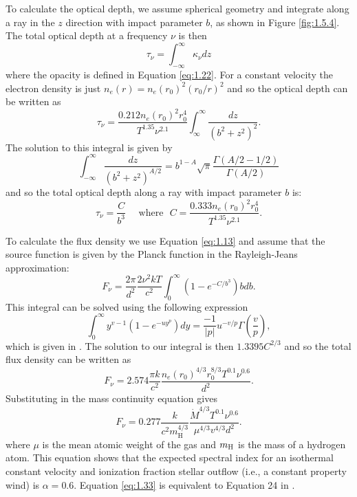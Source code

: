 To calculate the optical depth, we assume spherical geometry and integrate along a ray in the $z$ direction with impact parameter $b$, as shown in Figure \ref{fig:1.5.4}. The total optical depth at a frequency $\nu$ is then
\begin{equation}
\tau _{\nu} = \int ^{\infty} _{-\infty} \kappa _{\nu} dz
\end{equation}
where the opacity is defined in Equation \ref{eq:1.22}. For a constant velocity the electron density is just $n_{e}(r)=n_{e}(r_{0})^2(r_{0}/r)^2$ and so the optical depth can be written as
\begin{equation}
\tau _{\nu} = \frac{0.212n_{e}(r_{0})^2r_{0}^4}{T^{1.35}\nu ^{2.1}}\int ^{\infty} _{\infty}\frac{dz}{(b^2 + z^2)^2}.
\end{equation}
The solution to this integral is given by
\begin{equation}
\int ^{\infty} _{-\infty} \frac{dz}{(b^2 + z^2)^{A/2}}=b^{1-A}\sqrt{\pi}\frac{\Gamma (A/2 -1/2)}{\Gamma (A/2)}
\end{equation}
and so the total optical depth along a ray with impact parameter $b$ is:
\begin{equation}
\tau _{\nu} = \frac{C}{b^3}\ \ \ \ \ \ \mathrm{where}\ \ \ C=\frac{0.333n_{e}(r_{0})^2r_{0}^4}{T^{1.35}\nu ^{2.1}}.
\end{equation}

To calculate the flux density we use Equation \ref{eq:1.13} and assume that the source function is given by the Planck function in the Rayleigh-Jeans approximation:
\begin{equation}
F_{\nu} = \frac{2\pi}{d^2}\frac{2\nu ^2 kT}{c^2} \int ^{\infty} _{0}(1-e^{-C/b^3})bdb.
\end{equation}
This integral can be solved using the following expression
\begin{equation}
\int ^{\infty} _{0}y^{v-1}(1-e^{-uy^p})dy=\frac{-1}{|p|}u^{-v/p}\Gamma \left(\frac{v}{p} \right),
\end{equation}
which is given in \cite{gradshteyn_1994}. The solution to our integral is then $1.3395C^{2/3}$ and so the total flux density can be written as 
\begin{equation}\label{eq:1.32}
F_{\nu} = 2.574\frac{\pi k}{c^2}\dfrac{n_e(r_0)^{4/3}r_0^{8/3}T^{0.1}\nu ^{0.6}}{d^2}.
\end{equation}
Substituting in the mass continuity equation gives
\begin{equation}\label{eq:1.33}
F_{\nu} = 0.277\frac{k}{c^2 m_{\mathrm{H}}^{4/3}}\dfrac{\dot{M}^{4/3}T^{0.1}\nu ^{0.6}}{\mu ^{4/3}v^{4/3}d^2}.
\end{equation}
where $\mu$ is the mean atomic weight of the gas and $m_{\rm{H}}$ is the mass of a hydrogen atom. This equation shows that the expected spectral index for an isothermal constant velocity and ionization fraction stellar outflow (i.e., a constant property wind) is $\alpha =0.6$. Equation \ref{eq:1.33} is equivalent to Equation 24 in \cite{panagia_1975}.

